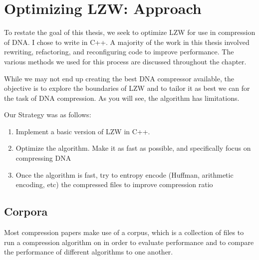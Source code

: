 \documentclass[12pt,twoside]{reedthesis}
\providecommand{\tightlist}{%
  \setlength{\itemsep}{0pt}\setlength{\parskip}{0pt}}
\begin{document}
\hypertarget{optimizing-lzw-approach}{%
\chapter{Optimizing LZW: Approach}\label{optimizing-lzw-approach}}

To restate the goal of this thesis, we seek to optimize LZW for use in compression of DNA. I chose to write in C++. A majority of the work in this thesis involved rewriting, refactoring, and reconfiguring code to improve performance. The various methods we used for this process are discussed throughout the chapter.

While we may not end up creating the best DNA compressor available, the objective is to explore the boundaries of LZW and to tailor it as best we can for the task of DNA compression. As you will see, the algorithm has limitations.

Our Strategy was as follows:
\begin{enumerate}
\def\labelenumi{\arabic{enumi}.}
\tightlist
\item
  Implement a basic version of LZW in C++.
\item
  Optimize the algorithm. Make it as fast as possible, and specifically focus on compressing DNA
\item
  Once the algorithm is fast, try to entropy encode (Huffman, arithmetic encoding, etc) the compressed files to improve compression ratio
\end{enumerate}
\hypertarget{corpora}{%
\section{Corpora}\label{corpora}}

Most compression papers make use of a corpus, which is a collection of files to run a compression algorithm on in order to evaluate performance and to compare the performance of different algorithms to one another.
\end{document}
